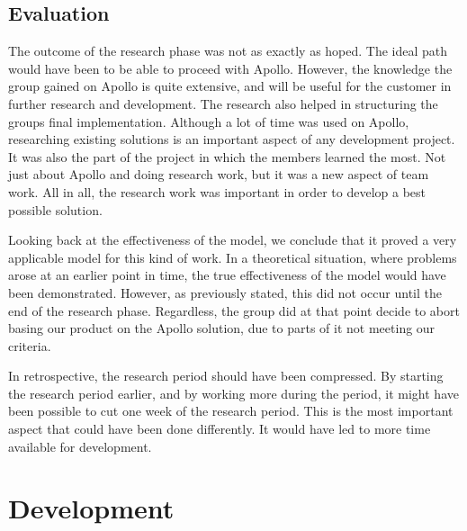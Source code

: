 
\subsection{Evaluation}

The outcome of the research phase was not as exactly as hoped. The ideal path would have been to be able to proceed with Apollo. However, the knowledge the group gained on Apollo is quite extensive, and will be useful for the customer in further research and development. The research also helped in structuring the groups final implementation. Although a lot of time was used on Apollo, researching existing solutions is an important aspect of any development project. It was also the part of the project in which the members learned the most. Not just about Apollo and doing research work, but it was a new aspect of team work. All in all, the research work was important in order to develop a best possible solution.

Looking back at the effectiveness of the model, we conclude that it proved a very applicable model for this kind of work. In a theoretical situation, where problems arose at an earlier point in time, the true effectiveness of the model would have been demonstrated. However, as previously stated, this did not occur until the end of the research phase. Regardless, the group did at that point decide to abort basing our product on the Apollo solution, due to parts of it not meeting our criteria.

In retrospective, the research period should have been compressed. By starting the research period earlier, and by working more during the period, it might have been possible to cut one week of the research period. This is the most important aspect that could have been done differently. It would have led to more time available for development. 

\section{Development}


